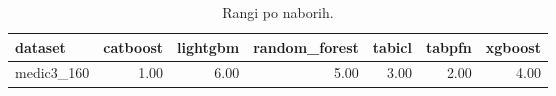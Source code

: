 \begin{table}[htbp]
\centering
\caption{Rangi po naborih.}
\label{tab:ranks}
\begin{tabular}{lrrrrrr}
\hline
dataset & catboost & lightgbm & random\_forest & tabicl & tabpfn & xgboost \\
\hline
medic3\_160 & 1.00 & 6.00 & 5.00 & 3.00 & 2.00 & 4.00 \\
\hline
\end{tabular}
\end{table}
